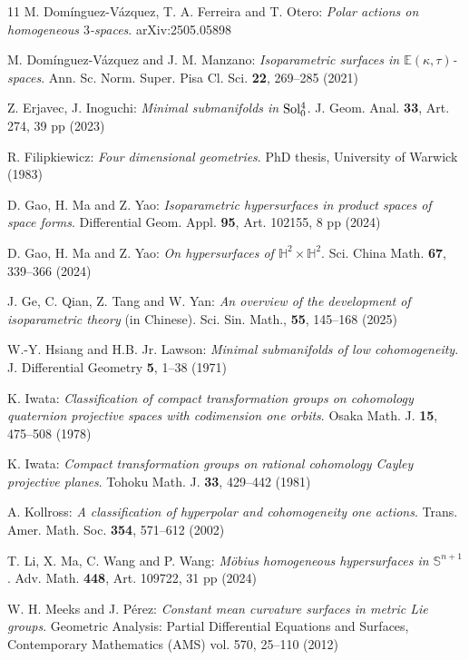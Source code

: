 \documentclass[reqno]{amsart}%
\theoremstyle{definition}
\numberwithin{equation}{section}
\begin{document}
\begin{thebibliography}{11}
		M. Dom\'{i}nguez-V\'{a}zquez, T. A. Ferreira and T. Otero:
		{\it Polar actions on homogeneous $3$-spaces}.
		arXiv:2505.05898
		
		M. Dom\'{i}nguez-V\'{a}zquez and J. M. Manzano:
		{\it Isoparametric surfaces in $\mathbb{E}(\kappa,\tau)$-spaces}.
		Ann. Sc. Norm. Super. Pisa Cl. Sci. {\bf 22}, 269--285 (2021)
		
		Z. Erjavec, J. Inoguchi:
		{\it Minimal submanifolds in ${\rm Sol_0^4}$}.
		J. Geom. Anal. {\bf 33}, Art. 274, 39 pp (2023)
		
		R. Filipkiewicz:
		{\it Four dimensional geometries}.
		PhD thesis, University of Warwick (1983)
		
		D. Gao, H. Ma and Z. Yao:
		{\it Isoparametric hypersurfaces in product spaces of space forms}.
		Differential Geom. Appl. {\bf 95}, Art. 102155, 8 pp  (2024)
		
		D. Gao, H. Ma and Z. Yao:
		{\it On hypersurfaces of $\mathbb{H}^2\times\mathbb{H}^2$}.
		Sci. China Math. {\bf 67}, 339--366 (2024)
		
		J. Ge, C. Qian, Z. Tang and W. Yan:
		{\it An overview of the development of isoparametric
			theory} (in Chinese).
		Sci. Sin. Math., {\bf 55}, 145--168 (2025)
		
		W.-Y. Hsiang and H.B. Jr. Lawson:
		{\it Minimal submanifolds of low cohomogeneity}.
		J. Differential Geometry {\bf 5}, 1--38 (1971)
		
		K. Iwata:
		{\it Classification of compact transformation groups on cohomology quaternion
			projective spaces with codimension one orbits}.
		Osaka Math. J. {\bf 15}, 475--508 (1978)
		
		K. Iwata:
		{\it Compact transformation groups on rational cohomology Cayley projective planes}.
		Tohoku Math. J. {\bf 33}, 429--442 (1981)
		
		A. Kollross:
		{\it A classification of hyperpolar and cohomogeneity one actions}.
		Trans. Amer. Math. Soc. {\bf 354}, 571--612 (2002)
		
		T. Li, X. Ma, C. Wang and P. Wang:
		{\it M\"{o}bius homogeneous hypersurfaces in $\mathbb{S}^{n+1}$}.
		Adv. Math. {\bf 448}, Art. 109722, 31 pp (2024)
		
		
		W. H. Meeks and J. P\'{e}rez: {\it Constant mean curvature surfaces in metric Lie groups}. Geometric Analysis: Partial Differential Equations and Surfaces, Contemporary Mathematics (AMS) vol. 570, 25--110 (2012)
		

\end{thebibliography}
\end{document}
